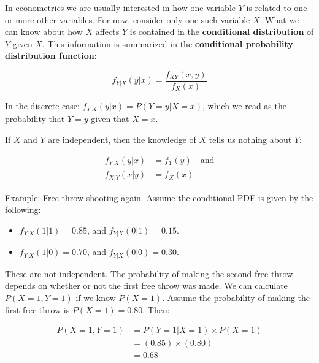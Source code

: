 \documentclass[11pt]{article}
\begin{document}
\vspace{2mm}

In econometrics we are usually interested in how one variable $Y$ is related to one or more other variables. For now,
consider only one such variable $X$. What we can know about how $X$ affects $Y$ is contained in the \textbf{conditional
distribution} of $Y$ given $X$. This information is summarized in the
\textbf{conditional probability distribution function}:

\begin{equation*}
f_{Y|X}(y|x) = \frac{f_{XY}(x, y)}{f_{X}(x)}
\end{equation*}

\vspace{2mm}

In the discrete case: $f_{Y|X}(y|x) = P(Y=y|X=x)$, which we read as the probability that $Y=y$ given that $X=x$.

\vspace{2mm}

If $X$ and $Y$ are independent, then the knowledge of $X$ tells us nothing about $Y$:

\begin{align*}
f_{Y|X}(y|x) &= f_{Y}(y) \quad \mbox{and} \\
f_{X|Y}(x|y) &= f_{X}(x)
\end{align*}


\vspace{2mm}

Example: Free throw shooting again. Assume the conditional PDF is given by the following:

\begin{itemize}
 \item[] $f_{Y|X}(1|1) = 0.85$, and $f_{Y|X}(0|1) = 0.15$.
 \item[] $f_{Y|X}(1|0) = 0.70$, and $f_{Y|X}(0|0) = 0.30$.
\end{itemize}

These are not independent. The probability of making the second free throw depends on whether or not the first
free throw was made. We can calculate $P(X=1, Y=1)$ if we know $P(X=1)$. Assume the probability of making the
first free throw is $P(X=1) = 0.80$. Then:

\begin{align*}
P(X=1, Y=1) &= P(Y=1|X=1) \times P(X=1) \\
            &= (0.85) \times (0.80)     \\
            &= 0.68
\end{align*}
\end{document}
